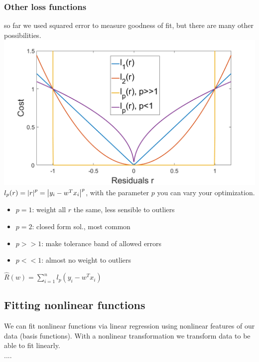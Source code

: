 \documentclass[a4paper, fontsize=8pt, landscape, DIV=1]{scrartcl}
\begin{document}
\begin{multicols*}{4}
		\subsubsection{Other loss functions}
		so far we used squared error to measure goodness of fit, but there are many other possibilities. 
		\includegraphics[width=\columnwidth]{images/Regression/loss_functions.png}
	 	$l_p(r)=\left\vert r\right\vert^p=\left\vert y_i-w^Tx_i\right\vert^p$, with the parameter $p$ you can vary your optimization. 
	 	\begin{itemize}[noitemsep]
	 		\item $p=1$: weight all $r$ the same, less sensible to outliers 
	 		\item $p=2$: closed form sol., most common
	 		\item $p>>1$: make tolerance band of allowed errors
	 		\item $p<<1$: almost no weight to outliers
	 	\end{itemize}
		$\hat{R}(w)=\sum_{i=1}^{n}l_p(y_i-w^Tx_i)$
		\newpage 
		
		\subsection{Fitting nonlinear functions}
		We can fit nonlinear functions via linear regression using nonlinear features of our data (basis functions). With a nonlinear transformation we transform data to be able to fit linearly.\\
		.... 
	\end{multicols*}
	\setcounter{secnumdepth}{3}
\end{document}
